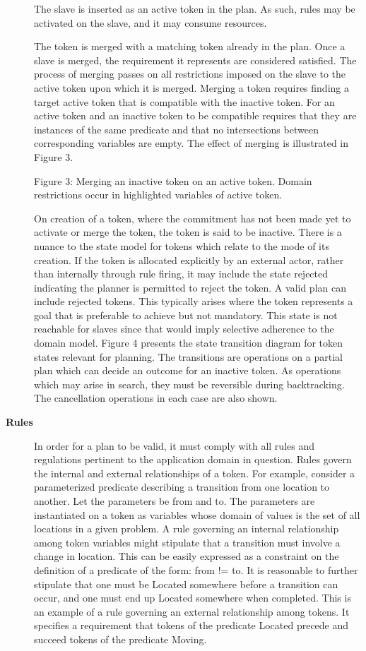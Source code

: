 \begin{description}
The slave is inserted as an active token in the plan. As such, rules
may be activated on the slave, and it may consume resources.

The token is merged with a matching token already in the plan. Once a
slave is merged, the requirement it represents are considered
satisfied. The process of merging passes on all restrictions imposed
on the slave to the active token upon which it is merged. Merging a
token requires finding a target active token that is compatible with
the inactive token. For an active token and an inactive token to be
compatible requires that they are instances of the same predicate and
that no intersections between corresponding variables are empty. The
effect of merging is illustrated in Figure 3.

Figure 3: Merging an inactive token on an active token. Domain
restrictions occur in highlighted variables of active token.

On creation of a token, where the commitment has not been made yet to
activate or merge the token, the token is said to be inactive. There
is a nuance to the state model for tokens which relate to the mode of
its creation. If the token is allocated explicitly by an external
actor, rather than internally through rule firing, it may include the
state rejected indicating the planner is permitted to reject the
token. A valid plan can include rejected tokens. This typically arises
where the token represents a goal that is preferable to achieve but
not mandatory. This state is not reachable for slaves since that would
imply selective adherence to the domain model. Figure 4 presents the
state transition diagram for token states relevant for planning. The
transitions are operations on a partial plan which can decide an
outcome for an inactive token. As operations which may arise in
search, they must be reversible during backtracking. The cancellation
operations in each case are also shown.

\item[\textbf{Rules}] In order for a plan to be valid, it must comply with all rules and
regulations pertinent to the application domain in question. Rules
govern the internal and external relationships of a token. For
example, consider a parameterized predicate describing a transition
from one location to another. Let the parameters be from and to. The
parameters are instantiated on a token as variables whose domain of
values is the set of all locations in a given problem. A rule
governing an internal relationship among token variables might
stipulate that a transition must involve a change in location. This
can be easily expressed as a constraint on the definition of a
predicate of the form: from != to. It is reasonable to further
stipulate that one must be Located somewhere before a transition can
occur, and one must end up Located somewhere when completed. This is
an example of a rule governing an external relationship among
tokens. It specifies a requirement that tokens of the predicate
Located precede and succeed tokens of the predicate Moving.


\end{description}
